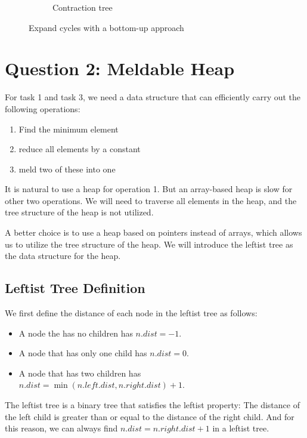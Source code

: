\documentclass[a4paper,12pt]{article}
\begin{document}
\begin{figure}[H]
\begin{subfigure}[t]{0.245\linewidth}
{
		}
		\caption{Contraction tree}
	\end{subfigure}
	\caption{Expand cycles with a bottom-up approach}
	\label{fig:expand}
\end{figure}

\section*{Question 2: Meldable Heap}

For task 1 and task 3, we need a data structure that can efficiently carry out the following operations:
\begin{enumerate}
	\item Find the minimum element
	\item reduce all elements by a constant
	\item meld two of these into one
\end{enumerate}

It is natural to use a heap for operation 1.
But an array-based heap is slow for other two operations.
We will need to traverse all elements in the heap, and the tree structure of the heap is not utilized.

A better choice is to use a heap based on pointers instead of arrays, which allows us to utilize the tree structure of the heap.
We will introduce the leftist tree as the data structure for the heap.

\subsection*{Leftist Tree Definition}

We first define the distance of each node in the leftist tree as follows:
\begin{itemize}
	\item A node the has no children has $n.dist = -1$.
	\item A node that has only one child has $n.dist = 0$.
	\item A node that has two children has $n.dist = \min(n.left.dist, n.right.dist) + 1$.
\end{itemize}

The leftist tree is a binary tree that satisfies the leftist property:
The distance of the left child is greater than or equal to the distance of the right child.
And for this reason, we can always find $n.dist = n.right.dist + 1$ in a leftist tree.
\end{document}
